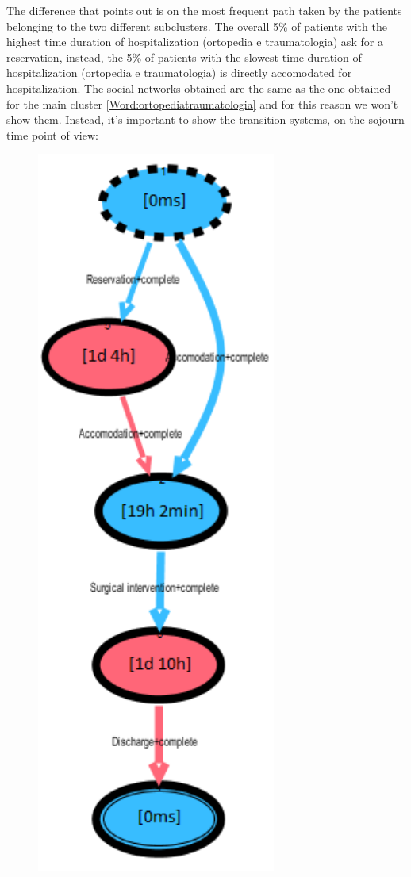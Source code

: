 The difference that points out is on the most frequent path taken by the patients belonging to the two different subclusters. The overall 5\% of patients with the highest time duration of hospitalization (ortopedia e traumatologia) ask for a reservation, instead, the 5\% of patients with the slowest time duration of hospitalization (ortopedia e traumatologia) is directly accomodated for hospitalization. The social networks obtained are the same as the one obtained for the main cluster \ref{Word:ortopediatraumatologia} and for this reason we won't show them. Instead, it's important to show the transition systems, on the sojourn time point of view:
\begin{figure} [htbp]
\begin{minipage}[t]{0.3\textwidth}
\includegraphics[width=0.7\textwidth]{RicoveriTransitionSystemSojourn3601Fast}

\end{minipage}
\end{figure}
